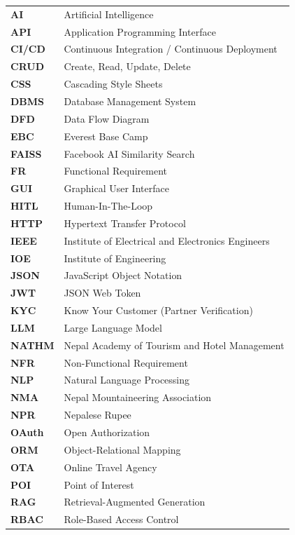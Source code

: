 \documentclass[12pt,a4paper]{report}
\begin{document}
\begin{tabularx}{\textwidth}{l X}
\textbf{AI} & Artificial Intelligence \\
\textbf{API} & Application Programming Interface \\
\textbf{CI/CD} & Continuous Integration / Continuous Deployment \\
\textbf{CRUD} & Create, Read, Update, Delete \\
\textbf{CSS} & Cascading Style Sheets \\
\textbf{DBMS} & Database Management System \\
\textbf{DFD} & Data Flow Diagram \\
\textbf{EBC} & Everest Base Camp \\
\textbf{FAISS} & Facebook AI Similarity Search \\
\textbf{FR} & Functional Requirement \\
\textbf{GUI} & Graphical User Interface \\
\textbf{HITL} & Human-In-The-Loop \\
\textbf{HTTP} & Hypertext Transfer Protocol \\
\textbf{IEEE} & Institute of Electrical and Electronics Engineers \\
\textbf{IOE} & Institute of Engineering \\
\textbf{JSON} & JavaScript Object Notation \\
\textbf{JWT} & JSON Web Token \\
\textbf{KYC} & Know Your Customer (Partner Verification) \\
\textbf{LLM} & Large Language Model \\
\textbf{NATHM} & Nepal Academy of Tourism and Hotel Management \\
\textbf{NFR} & Non-Functional Requirement \\
\textbf{NLP} & Natural Language Processing \\
\textbf{NMA} & Nepal Mountaineering Association \\
\textbf{NPR} & Nepalese Rupee \\
\textbf{OAuth} & Open Authorization \\
\textbf{ORM} & Object-Relational Mapping \\
\textbf{OTA} & Online Travel Agency \\
\textbf{POI} & Point of Interest \\
\textbf{RAG} & Retrieval-Augmented Generation \\
\textbf{RBAC} & Role-Based Access Control \\

\end{tabularx}
\end{document}
